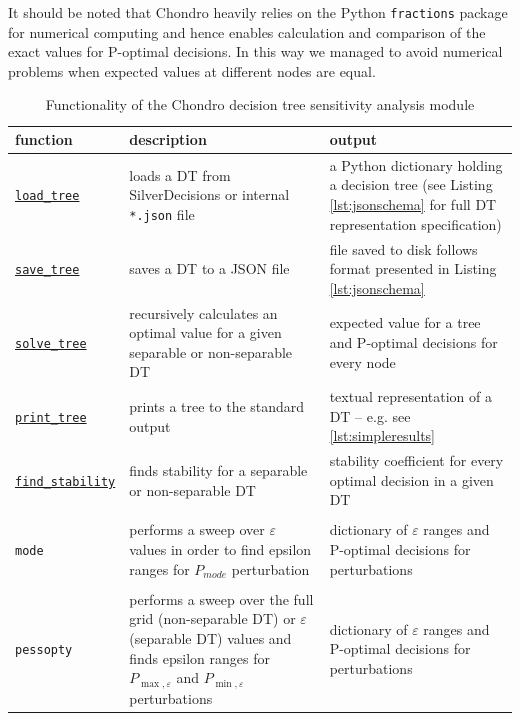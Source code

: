 \documentclass[a4paper,10pt,english]{sphinxmanual}
\begin{document}
	It should be noted that Chondro heavily relies on the Python \texttt{fractions} package for numerical computing and hence enables calculation and comparison of the exact values for P-optimal decisions. In this way we managed to avoid numerical problems when expected values at different nodes are equal.	
	
	\begin{table}
		\begin{tabularx}{\textwidth}{|l|X|X|}
			\hline  
			\textbf{function} & \textbf{description} & \textbf{output}\\ \hline
			\hyperref[index:chondro.load_tree]{\texttt{load\_tree}} & loads a DT from  SilverDecisions or internal \texttt{*.json} file & a Python dictionary holding a decision tree (see Listing \ref{lst:jsonschema} for full DT representation specification)\\ \hline
			\hyperref[index:chondro.save_tree]{\texttt{save\_tree}} & saves a DT to a JSON file & file saved to disk follows format presented in Listing \ref{lst:jsonschema} \\ \hline
			\hyperref[index:chondro.solve_tree]{\texttt{solve\_tree}} & recursively calculates an optimal value for a given separable or non-separable DT & expected value for a tree and P-optimal decisions for every node \\ \hline
			\hyperref[index:chondro.print_tree]{\texttt{print\_tree}} & prints a tree to the standard output & textual representation of a DT -- e.g. see \ref{lst:simpleresults} \\ \hline			
			\hyperref[index:chondro.find_stability]{\texttt{find\_stability}} & finds stability for a separable or non-separable DT & stability coefficient for every optimal decision in a given DT 
			\\ \hline
			\hyperref[index:chondro.find_perturbation_mode]{\pbox{5cm}{
					\texttt{find\_}\texttt{perturbation\_}\\ \texttt{mode}}} & performs a sweep over $\varepsilon$ values in order to find epsilon ranges for $P_{mode}$ perturbation & dictionary of $\varepsilon$ ranges and P-optimal decisions for perturbations
			\\ \hline
			\hyperref[index:chondro.find_perturbation_pessopty]{\pbox{5cm}{
					\texttt{find\_}\texttt{perturbation\_}\\ \texttt{pessopty}}} & performs a sweep over the full grid (non-separable DT) or $\varepsilon$ (separable DT) values and finds epsilon ranges for $P_{\max,\varepsilon}$ and $P_{\min,\varepsilon}$ perturbations & dictionary of $\varepsilon$ ranges and P-optimal decisions for perturbations
			\\ \hline			
		\end{tabularx} 
		\caption{Functionality of the Chondro decision tree sensitivity analysis module}\label{tab:chondro}
	\end{table}	
	
\end{document}
